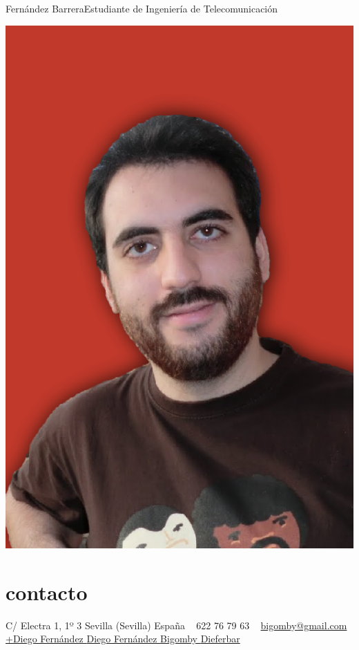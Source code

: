 \documentclass[hidelinks]{friggeri-cv} %
\begin{document}
 {Fernández Barrera}{Estudiante de Ingeniería de Telecomunicación} %


\begin{aside} %
\includegraphics[width=\textwidth]{images/photo.png}
\section{contacto}
C/ Electra 1, 1º 3
Sevilla (Sevilla)
España
~
\faPhone \hspace{0.1em} 622 76 79 63
~
\href{mailto:bigomby@gmail.com}{bigomby@gmail.com \hspace{0.1em} \faEnvelope }
\href{http://bit.ly/1CHJo3X}{+Diego Fernández  \hspace{0.1em} \faGooglePlus}
\href{http://linkd.in/1wwkBZE}{Diego Fernández \hspace{0.1em} \faLinkedin}
\href{http://bit.ly/1ySLWLv}{Bigomby \hspace{0.1em} \faGithub}
\href{http://bit.ly/18gzdrO}{Dieferbar \hspace{0.1em} \faTwitter}

\end{aside}
\end{document}
